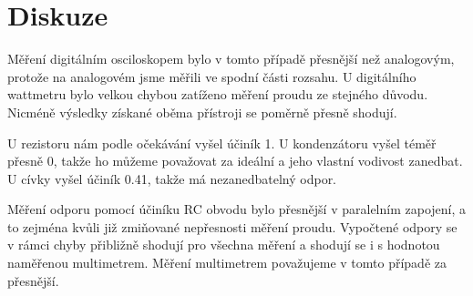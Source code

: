 \section*{Diskuze}
Měření digitálním osciloskopem bylo v tomto případě přesnější než analogovým, protože na analogovém jsme měřili ve spodní části rozsahu.
U digitálního wattmetru bylo velkou chybou zatíženo měření proudu ze stejného důvodu.
Nicméně výsledky získané oběma přístroji se poměrně přesně shodují.


U rezistoru nám podle očekávání vyšel účiník 1.
U kondenzátoru vyšel téměř přesně 0, takže ho můžeme považovat za ideální a jeho vlastní vodivost zanedbat.
U cívky vyšel účiník \num{0.41}, takže má nezanedbatelný odpor.

Měření odporu pomocí účiníku RC obvodu bylo přesnější v paralelním zapojení, a to zejména kvůli již zmiňované nepřesnosti měření proudu. Vypočtené odpory se v rámci chyby přibližně shodují pro všechna měření a shodují se i s hodnotou naměřenou multimetrem.
Měření multimetrem považujeme v tomto případě za přesnější.